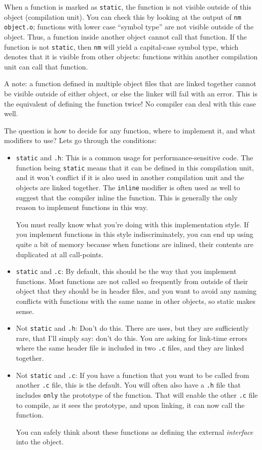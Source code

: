 \documentclass[11pt,onecolumn]{article}
\begin{document}
When a function is marked as {\tt static}, the function is not visible
outside of this object (compilation unit).  You can check this by
looking at the output of {\tt nm object.o}; functions with lower case
``symbol type'' are not visible outside of the object.  Thus, a
function inside another object cannot call that function.  If the
function is not {\tt static}, then {\tt nm} will yield a capital-case
symbol type, which denotes that it is visible from other objects:
functions within another compilation unit can call that function.

A note: a function defined in multiple object files that are linked
together cannot be visible outside of either object, or else the
linker will fail with an error.  This is the equivalent of defining
the function twice!  No compiler can deal with this case well.

The question is how to decide for any function, where to implement it,
and what modifiers to use?  Lets go through the conditions:
\begin{itemize}[itemsep=0pt,topsep=1pt,parsep=1pt,leftmargin=2.5em]
\item {\tt static} and {\tt *.h}: This is a common usage for
  performance-sensitive code.  The function being {\tt static} means
  that it can be defined in this compilation unit, and it won't
  conflict if it is also used in another compilation unit and the
  objects are linked together.  The {\tt inline} modifier is often
  used as well to suggest that the compiler inline the function.  This
  is generally the only reason to implement functions in this way.

  You must really know what you're doing with this implementation
  style.  If you implement functions in this style indiscriminately,
  you can end up using quite a bit of memory because when functions
  are inlined, their contents are duplicated at all call-points. 
\item {\tt static} and {\tt *.c}: By default, this should be the way
  that you implement functions.  Most functions are not called so
  frequently from outside of their object that they should be in
  header files, and you want to avoid any naming conflicts with
  functions with the same name in other objects, so static makes
  sense.
\item Not {\tt static} and {\tt *.h}: Don't do this.  There are uses,
  but they are sufficiently rare, that I'll simply say: don't do this.
  You are asking for link-time errors where the same header file is
  included in two {\tt *.c} files, and they are linked together.
\item Not {\tt static} and {\tt *.c}: If you have a function that you
  want to be called from another {\tt *.c} file, this is the default.
  You will often also have a {\tt *.h} file that includes {\tt only}
  the prototype of the function.  That will enable the other {\tt *.c}
  file to compile, as it sees the prototype, and upon linking, it can
  now call the function.

  You can safely think about these functions as defining the external
  {\em interface} into the object.
\end{itemize}
\end{document}
